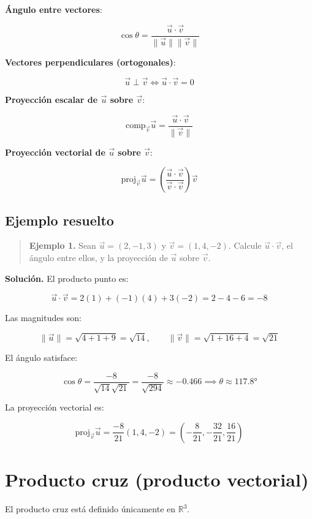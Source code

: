 \documentclass[
]{book}
\begin{document}
\textbf{Ángulo entre vectores}:

\[
\cos\theta = \frac{\vec{u} \cdot \vec{v}}{\|\vec{u}\| \|\vec{v}\|}
\]

\textbf{Vectores perpendiculares (ortogonales)}:

\[
\vec{u} \perp \vec{v} \iff \vec{u} \cdot \vec{v} = 0
\]

\textbf{Proyección escalar de \(\vec{u}\) sobre \(\vec{v}\)}:

\[
\text{comp}_{\vec{v}} \vec{u} = \frac{\vec{u} \cdot \vec{v}}{\|\vec{v}\|}
\]

\textbf{Proyección vectorial de \(\vec{u}\) sobre \(\vec{v}\)}:

\[
\text{proj}_{\vec{v}} \vec{u} = \left( \frac{\vec{u} \cdot \vec{v}}{\vec{v} \cdot \vec{v}} \right) \vec{v}
\]

\subsection{Ejemplo resuelto}\label{ejemplo-resuelto}

\begin{quote}
\textbf{Ejemplo 1.} Sean \(\vec{u} = (2, -1, 3)\) y \(\vec{v} = (1, 4, -2)\). Calcule \(\vec{u} \cdot \vec{v}\), el ángulo entre ellos, y la proyección de \(\vec{u}\) sobre \(\vec{v}\).
\end{quote}

\textbf{Solución.} El producto punto es:

\[
\vec{u} \cdot \vec{v} = 2(1) + (-1)(4) + 3(-2) = 2 - 4 - 6 = -8
\]

Las magnitudes son:

\[
\|\vec{u}\| = \sqrt{4 + 1 + 9} = \sqrt{14}, \qquad \|\vec{v}\| = \sqrt{1 + 16 + 4} = \sqrt{21}
\]

El ángulo satisface:

\[
\cos\theta = \frac{-8}{\sqrt{14}\sqrt{21}} = \frac{-8}{\sqrt{294}} \approx -0.466 \implies \theta \approx 117.8°
\]

La proyección vectorial es:

\[
\text{proj}_{\vec{v}} \vec{u} = \frac{-8}{21}(1, 4, -2) = \left(-\frac{8}{21}, -\frac{32}{21}, \frac{16}{21}\right)
\]

\section{Producto cruz (producto vectorial)}\label{producto-cruz-producto-vectorial}

El producto cruz está definido únicamente en \(\mathbb{R}^3\).
\end{document}
